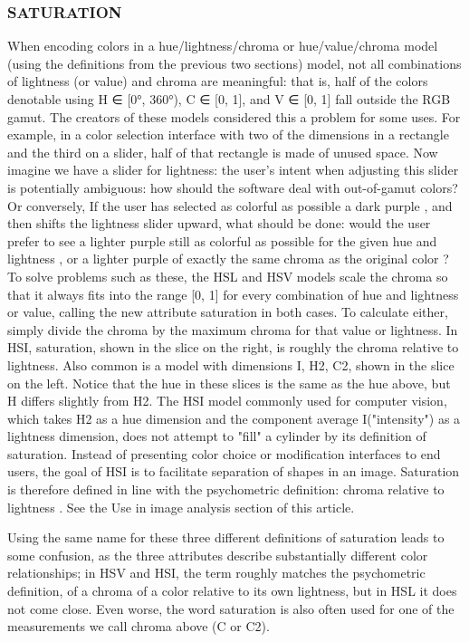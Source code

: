  \subsubsection{SATURATION}
 When encoding colors in a hue/lightness/chroma or hue/value/chroma model (using the definitions from the previous two sections) model, not all combinations of lightness (or value) and chroma are meaningful: that is, half of the colors denotable using H ∈ [0°, 360°), C ∈ [0, 1], and V ∈ [0, 1] fall outside the RGB gamut. The creators of these models considered this a problem for some uses. For example, in a color selection interface with two of the dimensions in a rectangle and the third on a slider, half of that rectangle is made of unused space. Now imagine we have a slider for lightness: the user’s intent when adjusting this slider is potentially ambiguous: how should the software deal with out-of-gamut colors? Or conversely, If the user has selected as colorful as possible a dark purple , and then shifts the lightness slider upward, what should be done: would the user prefer to see a lighter purple still as colorful as possible for the given hue and lightness , or a lighter purple of exactly the same chroma as the original color ?
To solve problems such as these, the HSL and HSV models scale the chroma so that it always fits into the range [0, 1] for every combination of hue and lightness or value, calling the new attribute saturation in both cases. To calculate either, simply divide the chroma by the maximum chroma for that value or lightness.
 In HSI, saturation, shown in the slice on the right, is roughly the chroma relative to lightness. Also common is a model with dimensions I, H2, C2, shown in the slice on the left. Notice that the hue in these slices is the same as the hue above, but H differs slightly from H2.
The HSI model commonly used for computer vision, which takes H2 as a hue dimension and the component average I("intensity") as a lightness dimension, does not attempt to "fill" a cylinder by its definition of saturation. Instead of presenting color choice or modification interfaces to end users, the goal of HSI is to facilitate separation of shapes in an image. Saturation is therefore defined in line with the psychometric definition: chroma relative to lightness . See the Use in image analysis section of this article.

Using the same name for these three different definitions of saturation leads to some confusion, as the three attributes describe substantially different color relationships; in HSV and HSI, the term roughly matches the psychometric definition, of a chroma of a color relative to its own lightness, but in HSL it does not come close. Even worse, the word saturation is also often used for one of the measurements we call chroma above (C or C2).

